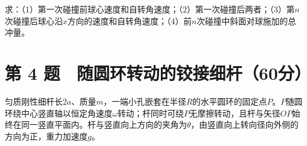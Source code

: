 \documentclass[12pt,a4paper,fontset=fandol]{ctexart}
\begin{document}
\begin{center}
\begin{minipage}{\linewidth}
\centering\begingroup{}
\ifdim\wd\diagrambox>.88\linewidth
\sbox{\diagrambox}{\resizebox{.88\linewidth}{!}{\usebox{\diagrambox}}}\fi
\ifdim\ht\diagrambox>.20\textheight
\resizebox{!}{.20\textheight}{\usebox{\diagrambox}}
\else\usebox{\diagrambox}\fi
\par{}\endgroup\end{minipage}\end{center}

求：（1）第一次碰撞前球心速度和自转角速度；（2）第一次碰撞后两者；（3）第\(n\)次碰撞后球心沿\(x\)方向的速度和自转角速度；（4）前\(n\)次碰撞中斜面对球施加的总冲量。

\clearpage

\section{第 4
题　随圆环转动的铰接细杆（60分）}\label{ux7b2c-4-ux9898-ux968fux5706ux73afux8f6cux52a8ux7684ux94f0ux63a5ux7ec6ux674660ux5206}

匀质刚性细杆长\(2a\)、质量\(m\)，一端小孔嵌套在半径\(R\)的水平圆环的固定点\(P\)。\(P\)随圆环绕中心竖直轴以恒定角速度\(\omega\)转动；杆同时可绕\(P\)无摩擦转动，且杆与矢径\(OP\)始终在同一竖直平面内。杆与竖直向上方向的夹角为\(\theta\)，由竖直向上转向径向外侧的方向为正，重力加速度\(g\)。
\end{document}
